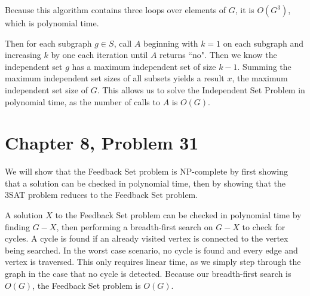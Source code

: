 \documentclass[12pt]{article}
\begin{document}
Because this algorithm contains three loops over elements of \(G\), it is \(O(G^3)\), which is polynomial time.

Then for each subgraph \(g\in S\), call \(A\) beginning with \(k=1\) on each subgraph and increasing \(k\) by one
each iteration until \(A\) returns ``no". Then we know the independent set \(g\) has a maximum independent set of size
\(k-1\). Summing the maximum independent set sizes of all subsets yields a result \(x\), the maximum independent set size
of \(G\). This allows us to solve the Independent Set Problem in polynomial time, as the number of calls to \(A\) is
\(O(G)\).

\pagebreak

\section*{Chapter 8, Problem 31}

We will show that the Feedback Set problem is NP-complete by first showing
that a solution can be checked in polynomial time, then by showing that the 3SAT problem reduces
to the Feedback Set problem.

A solution \(X\) to the Feedback Set problem can be checked in polynomial time by finding \(G-X\),
then performing a breadth-first search on \(G-X\) to check for cycles. A cycle is found if an already
visited vertex is connected to the vertex being searched. In the worst case scenario, no cycle is found and
every edge and vertex is traversed. This only requires linear time, as we simply step through the graph in the case
that no cycle is detected. Because our breadth-first search is \(O(G)\), the Feedback Set problem is \(O(G)\).
\end{document}
